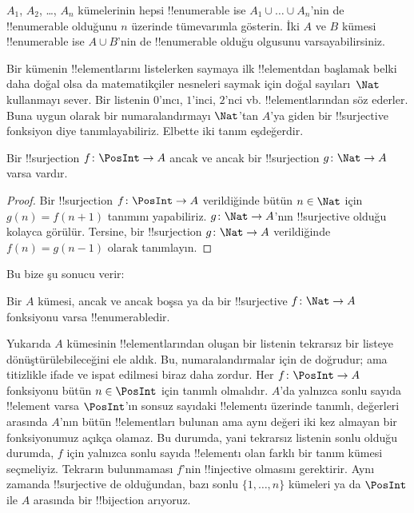 \documentclass[../../../include/open-logic-section]{subfiles}
\begin{document}
\begin{prob}
  $A_1$, $A_2$, \dots, $A_n$ kümelerinin hepsi !!{enumerable} ise $A_1 \cup
  \dots \cup A_n$'nin de !!{enumerable} olduğunu $n$ üzerinde tümevarımla
  gösterin. İki $A$ ve $B$ kümesi !!{enumerable} ise $A \cup B$'nin de
  !!{enumerable} olduğu olgusunu varsayabilirsiniz.
\end{prob}

Bir kümenin !!{element}larını listelerken saymaya ilk !!{element}dan başlamak
belki daha doğal olsa da matematikçiler nesneleri saymak için doğal
sayıları~$\Nat$ kullanmayı sever. Bir listenin $0$'ıncı, $1$'inci, $2$'nci
vb. !!{element}larından söz ederler. Buna uygun olarak bir numaralandırmayı
$\Nat$'tan $A$'ya giden bir !!{surjective} fonksiyon diye tanımlayabiliriz.
Elbette iki tanım eşdeğerdir.

\begin{prop}
  Bir !!{surjection} $f\colon \PosInt \to A$ ancak ve ancak bir
  !!{surjection} $g\colon \Nat \to A$ varsa vardır.
\end{prop}

\begin{proof}
  Bir !!{surjection} $f\colon \PosInt \to A$ verildiğinde bütün $n \in
  \Nat$ için $g(n)=f(n+1)$ tanımını yapabiliriz. $g\colon \Nat \to A$'nın
  !!{surjective} olduğu kolayca görülür. Tersine, bir !!{surjection}
  $g\colon \Nat \to A$ verildiğinde $f(n)=g(n-1)$ olarak tanımlayın.
\end{proof}

Bu bize şu sonucu verir:

\begin{cor}
Bir $A$ kümesi, ancak ve ancak boşsa ya da bir !!{surjective} $f\colon \Nat
\to A$ fonksiyonu varsa !!{enumerable}dir.
\end{cor}

Yukarıda $A$ kümesinin !!{element}larından oluşan bir listenin tekrarsız bir listeye
dönüştürülebileceğini ele aldık. Bu, numaralandırmalar için de doğrudur; ama
titizlikle ifade ve ispat edilmesi biraz daha zordur. Her $f\colon \PosInt
\to A$ fonksiyonu bütün $n \in \PosInt$ için tanımlı olmalıdır. $A$'da
yalnızca sonlu sayıda !!{element} varsa $\PosInt$'ın sonsuz sayıdaki
!!{element}ı üzerinde tanımlı, değerleri arasında $A$'nın bütün
!!{element}ları bulunan ama aynı değeri iki kez almayan bir fonksiyonumuz
açıkça olamaz. Bu durumda, yani tekrarsız listenin sonlu olduğu durumda,
$f$ için yalnızca sonlu sayıda !!{element}ı olan farklı bir tanım kümesi
seçmeliyiz. Tekrarın bulunmaması $f$'nin !!{injective} olmasını gerektirir.
Aynı zamanda !!{surjective} de olduğundan, bazı sonlu $\{1, \dots, n\}$
kümeleri ya da $\PosInt$ ile $A$ arasında bir !!{bijection} arıyoruz.
\end{document}
